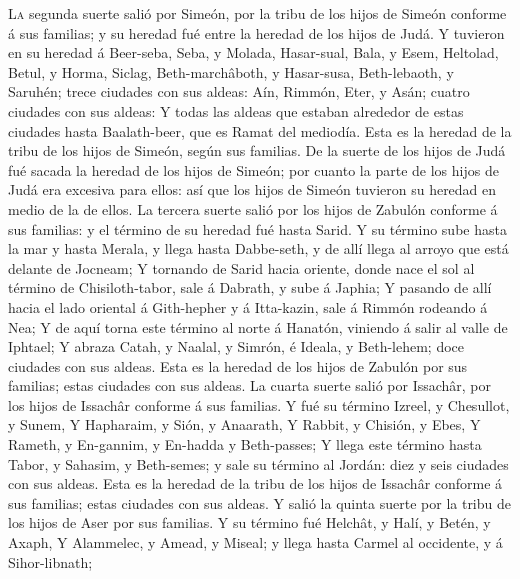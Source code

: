  \textsc{La} segunda suerte salió por Simeón, por la tribu
de los hijos de Simeón conforme á sus familias; y su heredad fué entre
la heredad de los hijos de Judá.  Y tuvieron en su heredad
á Beer-seba, Seba, y Molada,  Hasar-sual, Bala, y Esem,
 Heltolad, Betul, y Horma,  Siclag,
Beth-marchâboth, y Hasar-susa,  Beth-lebaoth, y Saruhén;
trece ciudades con sus aldeas:  Aín, Rimmón, Eter, y Asán;
cuatro ciudades con sus aldeas:  Y todas las aldeas que
estaban alrededor de estas ciudades hasta Baalath-beer, que es Ramat del
mediodía. Esta es la heredad de la tribu de los hijos de Simeón, según
sus familias.  De la suerte de los hijos de Judá fué
sacada la heredad de los hijos de Simeón; por cuanto la parte de los
hijos de Judá era excesiva para ellos: así que los hijos de Simeón
tuvieron su heredad en medio de la de ellos.  La tercera
suerte salió por los hijos de Zabulón conforme á sus familias: y el
término de su heredad fué hasta Sarid.  Y su término sube
hasta la mar y hasta Merala, y llega hasta Dabbe-seth, y de allí llega
al arroyo que está delante de Jocneam;  Y tornando de
Sarid hacia oriente, donde nace el sol al término de Chisiloth-tabor,
sale á Dabrath, y sube á Japhia;  Y pasando de allí hacia
el lado oriental á Gith-hepher y á Itta-kazin, sale á Rimmón rodeando á
Nea;  Y de aquí torna este término al norte á Hanatón,
viniendo á salir al valle de Iphtael;  Y abraza Catah, y
Naalal, y Simrón, é Ideala, y Beth-lehem; doce ciudades con sus aldeas.
 Esta es la heredad de los hijos de Zabulón por sus
familias; estas ciudades con sus aldeas.  La cuarta
suerte salió por Issachâr, por los hijos de Issachâr conforme á sus
familias.  Y fué su término Izreel, y Chesullot, y Sunem,
 Y Hapharaim, y Sión, y Anaarath,  Y
Rabbit, y Chisión, y Ebes,  Y Rameth, y En-gannim, y
En-hadda y Beth-passes;  Y llega este término hasta
Tabor, y Sahasim, y Beth-semes; y sale su término al Jordán: diez y seis
ciudades con sus aldeas.  Esta es la heredad de la tribu
de los hijos de Issachâr conforme á sus familias; estas ciudades con sus
aldeas.  Y salió la quinta suerte por la tribu de los
hijos de Aser por sus familias.  Y su término fué
Helchât, y Halí, y Betén, y Axaph,  Y Alammelec, y Amead,
y Miseal; y llega hasta Carmel al occidente, y á Sihor-libnath;
